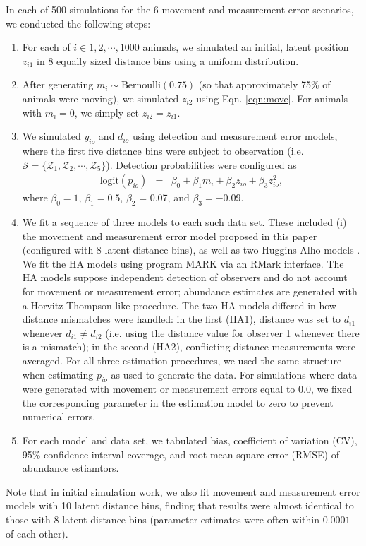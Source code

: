 \documentclass[aoas,preprint]{imsart}
\numberwithin{equation}{section}
\theoremstyle{plain}
\begin{document}
In each of 500 simulations for the 6 movement and measurement error scenarios, we conducted the following steps:
\begin{enumerate}
  \item For each of $i \in 1,2,\cdots,1000$ animals, we simulated an initial, latent position $z_{i1}$ in 8 equally sized distance bins using a uniform distribution.
  \item After generating $m_i \sim \text{Bernoulli}(0.75)$ (so that approximately 75\% of animals were moving), we simulated $z_{i2}$ using Eqn. \ref{eqn:move}.  For animals with $m_i=0$, we simply set $z_{i2}=z_{i1}$.
  \item We simulated $y_{io}$ and $d_{io}$ using detection and measurement error models, where the first five distance bins were subject to observation (i.e. $\mathcal{S} = \{ \mathcal{Z}_1, \mathcal{Z}_2, \cdots, \mathcal{Z}_5 \} $).  Detection probabilities were configured as
      \begin{eqnarray*}
        \text{logit}(p_{io}) & = & \beta_0 + \beta_1 m_i + \beta_2 z_{io} + \beta_3 z_{io}^2,
      \end{eqnarray*}
      where $\beta_0 = 1$, $\beta_1 = 0.5$, $\beta_2$ = 0.07, and $\beta_3 = -0.09$.
  \item We fit a sequence of three models to each such data set.  These included (i) the movement and measurement error model proposed in this paper (configured with 8 latent distance bins), as well as two Huggins-Alho models
    \citep[HA;][]{Huggins1989,Alho1990}.  We fit the HA models using program MARK \citep{WhiteBurnham1999} via an RMark \citep{Laake2013} interface. The HA models suppose independent detection of observers and do not account for movement or measurement error; abundance estimates are generated with a Horvitz-Thompson-like procedure. The two HA models differed in how distance mismatches were handled: in the first (HA1), distance was set to $d_{i1}$ whenever $d_{i1}\ne d_{i2}$ (i.e. using the distance value for observer 1 whenever there is a mismatch); in the second (HA2), conflicting distance measurements were averaged.  For all three estimation procedures, we used the same structure when estimating $p_{io}$ as used to generate the data.  For simulations where data were generated with movement or measurement errors equal to 0.0, we fixed the corresponding parameter in the estimation model to zero to prevent numerical errors.
  \item For each model and data set, we tabulated bias, coefficient of variation (CV), 95\% confidence interval coverage, and root mean square error (RMSE) of abundance estiamtors.
\end{enumerate}
Note that in initial simulation work, we also fit movement and measurement error models with 10 latent distance bins, finding that results were almost identical to those with 8 latent distance bins (parameter estimates were often within $0.0001$ of each other).
\end{document}
